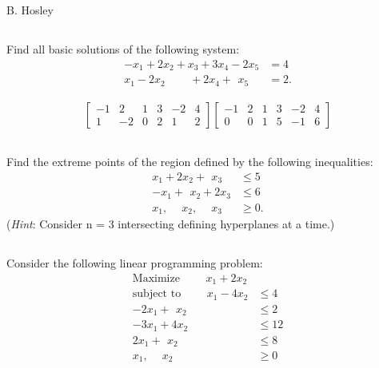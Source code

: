 \documentclass[12pt]{amsart}
\begin{document}
\hspace{\fill} {\large B. Hosley}
\bigskip


\setcounter{section}{2}
\setcounter{subsection}{23}
\subsection{}
Find all basic solutions of the following system:
\begin{align*}
	-x_1 + 2x_2  + x_3   + 3x_4 -    2x_5 &= 4 \\
	 x_1 - 2x_2 \qquad\, + 2x_4 + \,\ x_5 &= 2.
\end{align*}


\begin{align*}
	\left[
	\begin{array}{ccccc|c}
		-1 &  2 & 1 & 3 & -2 & 4 \\
		 1 & -2 & 0 & 2 &  1 & 2  
	\end{array}
	\right]
	\left[
	\begin{array}{ccccc|c}
		-1 & 2 & 1 & 3 & -2 & 4 \\
		 0 & 0 & 1 & 5 & -1 & 6  
	\end{array}
	\right]
\end{align*}



\setcounter{subsection}{39}
\subsection{}
Find the extreme points of the region defined by the following
inequalities:
\begin{align*}
	  x_1 + 2x_2 + \,\ x_3 &\leq 5 \\
	- x_1 + \,\ x_2 + 2x_3 &\leq 6 \\
	  x_1, \quad\ x_2, \quad\ x_3 &\geq 0.
\end{align*}
(\textit{Hint}: Consider n = 3 intersecting defining hyperplanes at a time.)


\setcounter{section}{3}
\setcounter{subsection}{0}
\subsection{}
Consider the following linear programming problem:
\begin{align*}
	\text{Maximize }\qquad  x_1 + 2x_2 & \\
	\text{subject to }\qquad x_1 - 4x_2 &\leq 4 \\
 	-2x_1 +\,\ x_2 &\leq 2  \\ 
 	-3x_1 +   4x_2 &\leq 12 \\
	 2x_1 +\,\ x_2 &\leq 8  \\
	  x_1,\quad\   x_2 &\geq 0	  
\end{align*}
\end{document}
